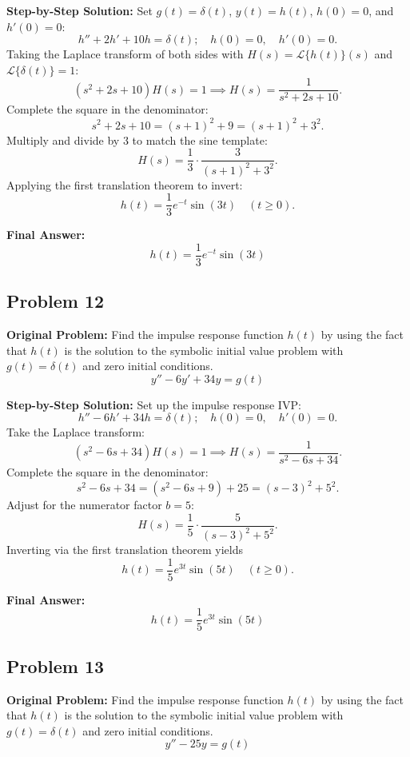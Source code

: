 \documentclass[11pt, letterpaper]{article}
\theoremstyle{definition}
\theoremstyle{remark}
\begin{document}
\textbf{Step-by-Step Solution:}
Set $g(t) = \delta(t)$, $y(t) = h(t)$, $h(0) = 0$, and $h'(0) = 0$:
\[
    h'' + 2h' + 10h = \delta(t); \quad h(0) = 0,\quad h'(0) = 0.
\]
Taking the Laplace transform of both sides with $H(s) = \mathcal{L}\{h(t)\}(s)$ and $\mathcal{L}\{\delta(t)\} = 1$:
\[
    (s^2 + 2s + 10)H(s) = 1 \implies H(s) = \frac{1}{s^2 + 2s + 10}.
\]
Complete the square in the denominator:
\[
    s^2 + 2s + 10 = (s + 1)^2 + 9 = (s + 1)^2 + 3^2.
\]
Multiply and divide by $3$ to match the sine template:
\[
    H(s) = \frac{1}{3}\cdot \frac{3}{(s + 1)^2 + 3^2}.
\]
Applying the first translation theorem to invert:
\[
    h(t) = \frac{1}{3}e^{-t}\sin(3t) \quad (t \ge 0).
\]

\textbf{Final Answer:}
\[
    h(t) = \frac{1}{3}e^{-t}\sin(3t)
\]

\subsection{Problem 12}
\textbf{Original Problem:}
Find the impulse response function $h(t)$ by using the fact that $h(t)$ is the solution to the symbolic initial value problem with $g(t) = \delta(t)$ and zero initial conditions.
\[
    y'' - 6y' + 34y = g(t)
\]

\textbf{Step-by-Step Solution:}
Set up the impulse response IVP:
\[
    h'' - 6h' + 34h = \delta(t); \quad h(0) = 0,\quad h'(0) = 0.
\]
Take the Laplace transform:
\[
    (s^2 - 6s + 34)H(s) = 1 \implies H(s) = \frac{1}{s^2 - 6s + 34}.
\]
Complete the square in the denominator:
\[
    s^2 - 6s + 34 = (s^2 - 6s + 9) + 25 = (s - 3)^2 + 5^2.
\]
Adjust for the numerator factor $b = 5$:
\[
    H(s) = \frac{1}{5}\cdot \frac{5}{(s - 3)^2 + 5^2}.
\]
Inverting via the first translation theorem yields
\[
    h(t) = \frac{1}{5}e^{3t}\sin(5t) \quad (t \ge 0).
\]

\textbf{Final Answer:}
\[
    h(t) = \frac{1}{5}e^{3t}\sin(5t)
\]

\subsection{Problem 13}
\textbf{Original Problem:}
Find the impulse response function $h(t)$ by using the fact that $h(t)$ is the solution to the symbolic initial value problem with $g(t) = \delta(t)$ and zero initial conditions.
\[
    y'' - 25y = g(t)
\]
\end{document}
